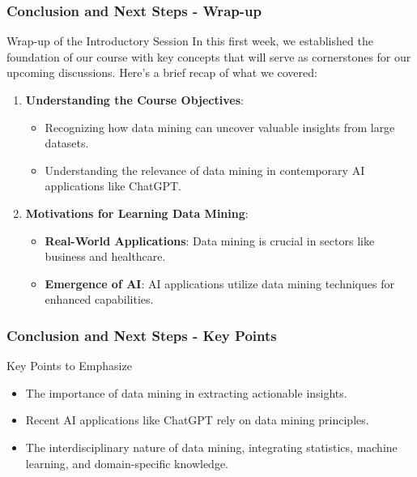 \documentclass[aspectratio=169]{beamer}
\begin{document}
\begin{frame}[fragile]
    \frametitle{Conclusion and Next Steps - Wrap-up}
    \begin{block}{Wrap-up of the Introductory Session}
        In this first week, we established the foundation of our course with key concepts that will serve as cornerstones for our upcoming discussions. Here’s a brief recap of what we covered:
    \end{block}
    
    \begin{enumerate}
        \item \textbf{Understanding the Course Objectives}:
            \begin{itemize}
                \item Recognizing how data mining can uncover valuable insights from large datasets.
                \item Understanding the relevance of data mining in contemporary AI applications like ChatGPT.
            \end{itemize}

        \item \textbf{Motivations for Learning Data Mining}:
            \begin{itemize}
                \item \textbf{Real-World Applications}: Data mining is crucial in sectors like business and healthcare.
                \item \textbf{Emergence of AI}: AI applications utilize data mining techniques for enhanced capabilities.
            \end{itemize}
    \end{enumerate}
\end{frame}

\begin{frame}[fragile]
    \frametitle{Conclusion and Next Steps - Key Points}
    \begin{block}{Key Points to Emphasize}
        \begin{itemize}
            \item The importance of data mining in extracting actionable insights.
            \item Recent AI applications like ChatGPT rely on data mining principles.
            \item The interdisciplinary nature of data mining, integrating statistics, machine learning, and domain-specific knowledge.
        \end{itemize}
    \end{block}
\end{frame}
\end{document}
